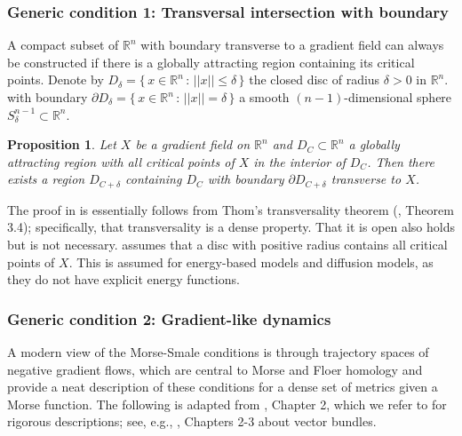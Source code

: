 \documentclass[12pt]{article}
\newtheorem{proposition}[theorem]{Proposition}
\begin{document}
\subsubsection{Generic condition 1: Transversal intersection with boundary}
\label{subsubsection:assumption-boundary}
A compact subset of $\mathbb{R}^n$ with boundary transverse to a gradient field can always be constructed if there is a globally attracting region containing its critical points. Denote by $D_{\delta}= \{\,x\in \mathbb{R}^n \, : \, ||x|| \leq \delta \,\}$ the closed disc of radius $\delta > 0$ in $\mathbb{R}^n$. with boundary $\partial D_{\delta} = \{\,x \in \mathbb{R}^n \, : \, ||x|| = \delta \,\}$ a smooth $(n-1)$-dimensional sphere $S_{\delta}^{n-1} \subset \mathbb{R}^n$.
\begin{proposition}
\label{proposition:globally-attracting-region-existence}
     Let $X$ be a gradient field on $\mathbb{R}^n$ and $D_C \subset \mathbb{R}^n$ a globally attracting region with all critical points of $X$ in the interior of $D_C$. Then there exists a region $D_{C+\delta}$ containing $D_C$ with boundary $\partial D_{C+\delta}$ transverse to $X$.
\end{proposition}

The proof in  is essentially follows from Thom's transversality theorem (\cite{palis2012geometric}, Theorem 3.4); specifically, that transversality is a dense property. That it is open also holds but is not necessary.  assumes that a disc with positive radius contains all critical points of $X$. This is assumed for energy-based models and diffusion models, as they do not have explicit energy functions.



\subsubsection{Generic condition 2: Gradient-like dynamics}
\label{subsubsection:trajectory-spaces-negative-gradients}
A modern view of the Morse-Smale conditions is through trajectory spaces of negative gradient flows, which are central to Morse and Floer homology and provide a neat description of these conditions for a dense set of metrics given a Morse function. The following is adapted from \cite{schwarz1993morse}, Chapter 2, which we refer to for rigorous descriptions; see, e.g., \cite{milnor1974characteristic}, Chapters 2-3 about vector bundles.
\end{document}
